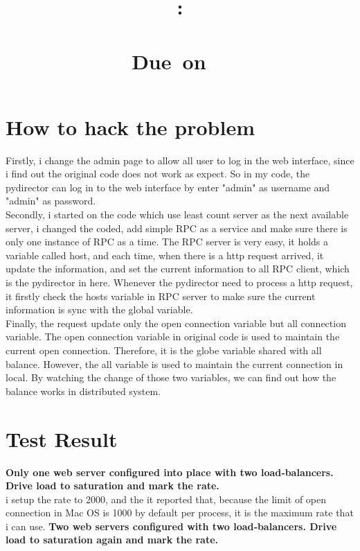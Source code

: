 \documentclass{article}
\title{
    \vspace{2in}
    \textmd{\textbf{\hmwkClass:\\\ \hmwkTitle}}\\
    \normalsize\vspace{0.1in}\small{Due\ on\ \hmwkDueDate\ }\\
    \vspace{0.1in}\large{\textit{\hmwkClassInstructor}}
    \vspace{3in}
}
\author{\textbf{\hmwkAuthorName}}
\date{}
\begin{document}
\maketitle
\newpage
\tableofcontents
\newpage


\section{How to hack the problem}
Firstly, i change the admin page to allow all user to log in the web interface, since i find out the original code does not work as expect. So in my code, the pydirector can log in to the web interface by enter "admin" as username and "admin" as password.\\

Secondly, i started on the code which use least count server as the next available server, i changed the coded, add simple RPC as a service and make sure there is only one instance of RPC as a time. The RPC server is very easy, it holds a variable called host, and each time, when there is a http request arrived, it update the information, and set the current information to all RPC client, which is the pydirector in here. Whenever the pydirector need to process a http request, it firstly check the hosts variable in RPC server to make sure the current information is sync with the global variable.\\

Finally, the request update only the open connection variable but all connection variable. The open connection variable in original code is used to maintain the current open connection. Therefore, it is the globe variable shared with all balance. However, the all variable is used to maintain the current connection in local. By watching the change of those two variables, we can find out how the balance works in distributed system.\\

\section{Test Result}
\textbf{Only one web server configured into place with two load‐balancers. Drive load to saturation and mark the rate.}\\
i setup the rate to 2000, and the it reported that, because the limit of open connection in Mac OS is 1000 by default per process, it is the maximum rate that i can use. 
\textbf{Two web servers configured with two load‐balancers. Drive load to saturation again and mark the rate.}\\
\end{document}
